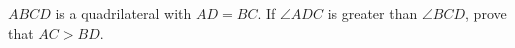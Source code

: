 $ABCD$ is a quadrilateral with $AD=BC$. If $\angle ADC$ is greater than $\angle BCD$,  prove that $AC>BD$.